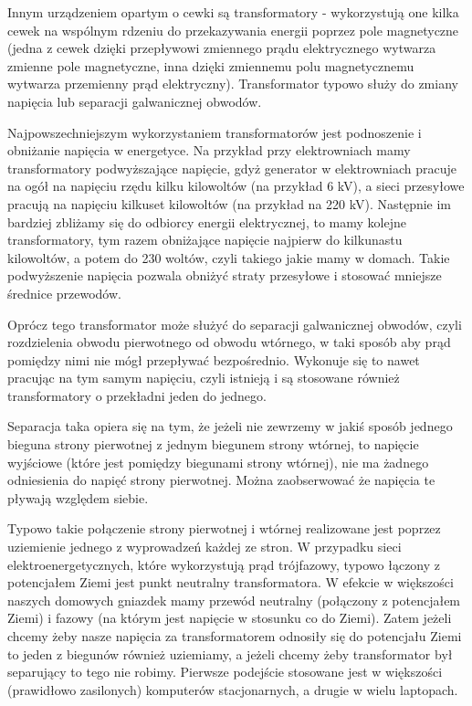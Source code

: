 Innym urządzeniem opartym o cewki są transformatory - wykorzystują one kilka cewek na wspólnym rdzeniu do przekazywania energii poprzez pole magnetyczne (jedna z cewek dzięki przepływowi zmiennego prądu elektrycznego wytwarza zmienne pole magnetyczne, inna dzięki zmiennemu polu magnetycznemu wytwarza przemienny prąd elektryczny). Transformator typowo służy do zmiany napięcia lub separacji galwanicznej obwodów.

Najpowszechniejszym wykorzystaniem transformatorów jest podnoszenie i obniżanie napięcia w energetyce. Na przykład przy elektrowniach mamy transformatory podwyższające napięcie, gdyż generator w elektrowniach pracuje na ogół na napięciu rzędu kilku kilowoltów (na przykład 6 kV), a sieci przesyłowe pracują na napięciu kilkuset kilowoltów (na przykład na 220 kV). Następnie im bardziej zbliżamy się do odbiorcy energii elektrycznej, to mamy kolejne transformatory, tym razem obniżające napięcie najpierw do kilkunastu kilowoltów, a potem do 230 woltów, czyli takiego jakie mamy w domach. Takie podwyższenie napięcia pozwala obniżyć straty przesyłowe i stosować mniejsze średnice przewodów.

Oprócz tego transformator może służyć do separacji galwanicznej obwodów, czyli rozdzielenia obwodu pierwotnego od obwodu wtórnego, w taki sposób aby prąd pomiędzy nimi nie mógł przepływać bezpośrednio. Wykonuje się to nawet pracując na tym samym napięciu, czyli istnieją i są stosowane również transformatory o przekładni jeden do jednego.

Separacja taka opiera się na tym, że jeżeli nie zewrzemy w jakiś sposób jednego bieguna strony pierwotnej z jednym biegunem strony wtórnej, to napięcie wyjściowe (które jest pomiędzy biegunami strony wtórnej), nie ma żadnego odniesienia do napięć strony pierwotnej. Można zaobserwować że napięcia te pływają względem siebie.

Typowo takie połączenie strony pierwotnej i wtórnej realizowane jest poprzez uziemienie jednego z wyprowadzeń każdej ze stron. W przypadku sieci elektroenergetycznych, które wykorzystują prąd trójfazowy, typowo łączony z potencjałem Ziemi jest punkt neutralny transformatora. W efekcie w większości naszych domowych gniazdek mamy przewód neutralny (połączony z potencjałem Ziemi) i fazowy (na którym jest napięcie w stosunku co do Ziemi). Zatem jeżeli chcemy żeby nasze napięcia za transformatorem odnosiły się do potencjału Ziemi to jeden z biegunów również uziemiamy, a jeżeli chcemy żeby transformator był separujący to tego nie robimy. Pierwsze podejście stosowane jest w większości (prawidłowo zasilonych) komputerów stacjonarnych, a drugie w wielu laptopach.

